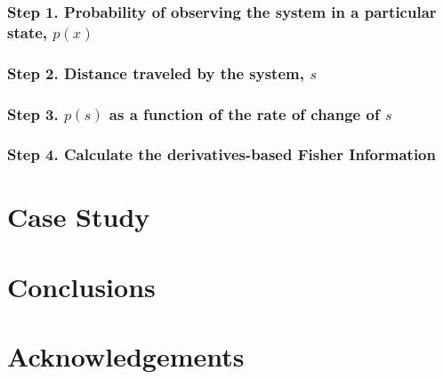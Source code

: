\documentclass[12pt,twoside,openany]{reedthesis}
\begin{document}
\hypertarget{step-1.-probability-of-observing-the-system-in-a-particular-state-px}{%
\subsubsection{\texorpdfstring{\textbf{Step 1. Probability of observing the system in a particular state, \(p(x)\)}}{Step 1. Probability of observing the system in a particular state, p(x)}}\label{step-1.-probability-of-observing-the-system-in-a-particular-state-px}}

\hypertarget{step-2.-distance-traveled-by-the-system-s}{%
\subsubsection{\texorpdfstring{\textbf{Step 2.} Distance traveled by the system, \(s\)}{Step 2. Distance traveled by the system, s}}\label{step-2.-distance-traveled-by-the-system-s}}

\hypertarget{step-3.-ps-as-a-function-of-the-rate-of-change-of-s}{%
\subsubsection{\texorpdfstring{\textbf{Step 3.} \(p(s)\) as a function of the rate of change of \(s\)}{Step 3. p(s) as a function of the rate of change of s}}\label{step-3.-ps-as-a-function-of-the-rate-of-change-of-s}}

\hypertarget{step-4.-calculate-the-derivatives-based-fisher-information}{%
\subsubsection{\texorpdfstring{\textbf{Step 4.} Calculate the derivatives-based Fisher Information}{Step 4. Calculate the derivatives-based Fisher Information}}\label{step-4.-calculate-the-derivatives-based-fisher-information}}

\hypertarget{case-study}{%
\section{Case Study}\label{case-study}}

\hypertarget{conclusions}{%
\section{Conclusions}\label{conclusions}}

\hypertarget{acknowledgements}{%
\section{Acknowledgements}\label{acknowledgements}}
\end{document}
